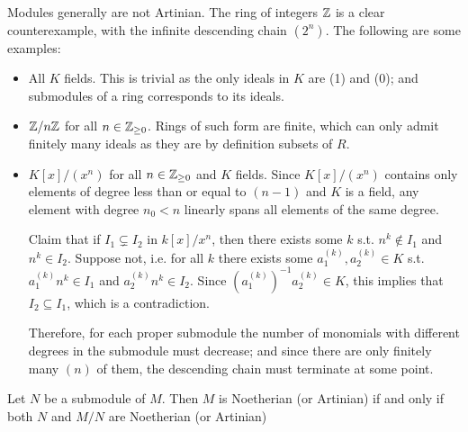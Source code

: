 \documentclass{article}
\begin{document}
\begin{remark}
    Modules generally are not Artinian. The ring of integers $\mathbb{Z}$ is a clear counterexample, with the infinite descending chain $(2^n)$. The following are some examples:
    \begin{itemize}
        \item All $K$ fields. This is trivial as the only ideals in $K$ are (1) and (0); and submodules of a ring corresponds to its ideals.
        \item $\mathbb{Z}/n\mathbb{Z}$ for all $n\in\mathbb{Z}_{\geq 0}$. Rings of such form are finite, which can only admit finitely many ideals as they are by definition subsets of $R$.
        \item $K[x]/(x^n)$ for all $n\in\mathbb{Z}_{\geq 0}$ and $K$ fields. Since $K[x]/(x^n)$ contains only elements of degree less than or equal to $(n-1)$ and $K$ is a field, any element with degree $n_0 < n$ linearly spans all elements of the same degree. 
        
        Claim that if $I_1\subsetneq I_2$ in $k[x]/x^n$, then there exists some $k$ s.t. $n^k\notin I_1$ and $n^k\in I_2$. Suppose not, i.e. for all $k$ there exists some $a_1^{(k)}, a_2^{(k)}\in K$ s.t. $a_1^{(k)} n^k\in I_1$ and $a_2^{(k)} n^k\in I_2$. Since $(a_1^{(k)})^{-1}a_2^{(k)}\in K$, this implies that $I_2\subseteq I_1$, which is a contradiction.

        Therefore, for each proper submodule the number of monomials with different degrees in the submodule must decrease; and since there are only finitely many $(n)$ of them, the descending chain must terminate at some point. 
    \end{itemize}
\end{remark}

\begin{proposition}\label{thm:Module Noeth iff sub and quot Noeth}
    Let $N$ be a submodule of $M$. Then $M$ is Noetherian (or Artinian) if and only if both $N$ and $M/N$ are Noetherian (or Artinian)
\end{proposition}
\end{document}
